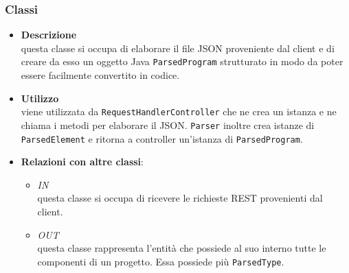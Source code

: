 \subsubsection{Classi}
\label{\nogloxy{swedesigner::server::parser::Parser}}
\begin{itemize}
\item \textbf{Descrizione}\\
questa classe si occupa di elaborare il file JSON proveniente dal client e di creare da esso un oggetto Java \texttt{ParsedProgram} strutturato in modo da poter essere facilmente convertito in codice.
\item \textbf{Utilizzo}\\
viene utilizzata da \texttt{RequestHandlerController} che ne crea un istanza e ne chiama i metodi per elaborare il JSON. \texttt{Parser} inoltre crea istanze di \texttt{ParsedElement} e ritorna a controller un'istanza di \texttt{ParsedProgram}.
\item \textbf{Relazioni con altre classi}:
\begin{itemize}
\item \textit{IN} \hyperref[\nogloxy{swedesigner::server::controller::RequestHandlerController}]{}\\
questa classe si occupa di ricevere le richieste REST provenienti dal client.
\item \textit{OUT} \hyperref[\nogloxy{swedesigner::server::project::ParsedProgram}]{}\\
questa classe rappresenta l'entità che possiede al suo interno tutte le componenti di un progetto. Essa possiede più \texttt{ParsedType}.
\end{itemize}
\end{itemize}
\subsection{}
\label{\nogloxy{swedesigner::server::project}}
